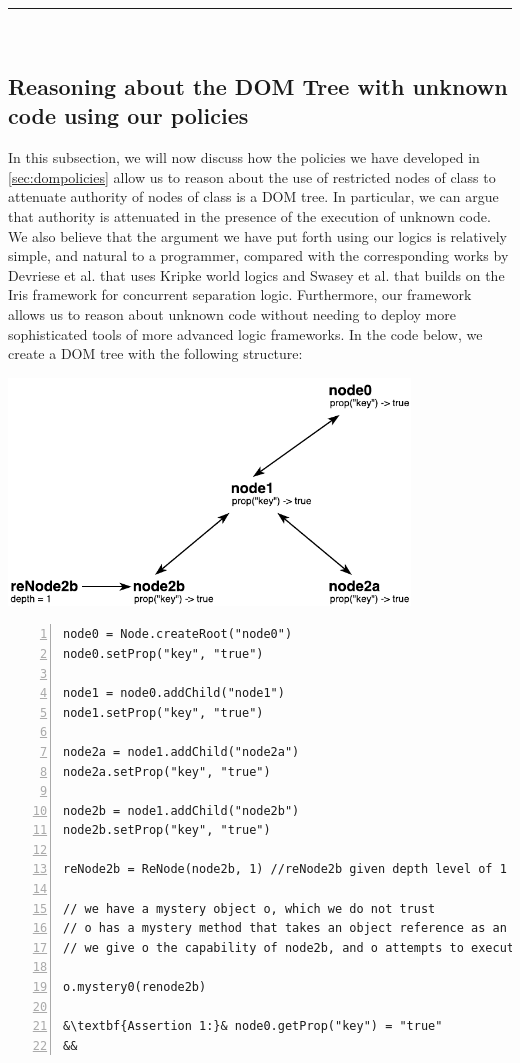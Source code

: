 \documentclass[a4paper,11pt,twoside]{article}
\newcommand{\hr}{\rule{\linewidth}{0.4pt}}
\begin{document}
\hr\\

\subsection{Reasoning about the DOM Tree with unknown code using our policies}
In this subsection, we will now discuss how the policies we have developed in \cref{sec:dompolicies} allow us to reason about  the use of restricted nodes of class  to attenuate authority of nodes of class  is a DOM tree. In particular, we can argue that authority is attenuated in the presence of the execution of unknown code. We also believe that the argument we have put forth using our logics is relatively simple, and natural to a programmer, compared with the corresponding works by Devriese et al.\cite{devriese2016} that uses Kripke world logics and Swasey et al.\cite{swasey2017} that builds on the Iris framework for concurrent separation logic. Furthermore, our framework allows us to reason about unknown code without needing to deploy more sophisticated tools of more advanced logic frameworks. In the code below, we create a DOM tree with the following structure:\\
\begin{minipage}{\textwidth}
\centering
\includegraphics[width=0.80\textwidth]{figures/assertion.pdf}
  \label{DOM example}
\end{minipage}
\begin{lstlisting}[numbers = left]
node0 = Node.createRoot("node0")
node0.setProp("key", "true")

node1 = node0.addChild("node1")
node1.setProp("key", "true")

node2a = node1.addChild("node2a")
node2a.setProp("key", "true")

node2b = node1.addChild("node2b")
node2b.setProp("key", "true")

reNode2b = ReNode(node2b, 1) //reNode2b given depth level of 1

// we have a mystery object o, which we do not trust
// o has a mystery method that takes an object reference as an argument
// we give o the capability of node2b, and o attempts to execute a mystery method on renode2b:

o.mystery0(renode2b)

&\textbf{Assertion 1:}& node0.getProp("key") = "true"
&&
\end{lstlisting} 
\end{document}
